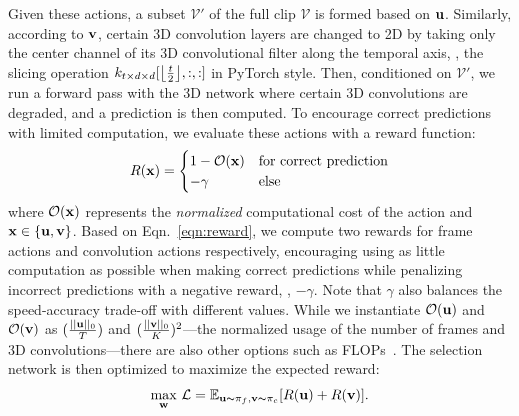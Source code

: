 \documentclass[final]{cvpr}
\DeclarePairedDelimiter\floor{\lfloor}{\rfloor}
\begin{document}
Given these actions, a subset $\mathcal{V}'$ of the full clip $\mathcal{V}$ is formed based on $\bf u$. Similarly, according to $\bf v$, certain 3D convolution layers are changed to 2D by taking only the center channel of its 3D convolutional filter along the temporal axis, \ie, the slicing operation $k_{t \times d \times d} [\floor*{\frac{t}{2}}, :, :]$ in PyTorch style. Then, conditioned on $\mathcal{V}'$, we run a forward pass with the 3D network where certain 3D convolutions are degraded, and a prediction is then computed. To encourage correct predictions with limited computation, we evaluate these actions with a reward function:
\begin{align}
R({\bf x}) = 
\begin{cases}
    1- \mathcal{O({\bf x})}   & \text{for correct prediction}\\
    -\gamma     & \text{else} \\
\end{cases}
\label{eqn:reward}
\end{align}
where $ \mathcal{O}({\bf x})$ represents the \emph{normalized} computational cost of the action and $\bf x \in \{\bf u, \bf v \}$. Based on Eqn.~\ref{eqn:reward}, we compute two rewards for frame actions and convolution actions respectively, encouraging using as little computation as possible when making correct predictions while penalizing incorrect predictions with a negative reward, \ie, $-\gamma$. Note that $\gamma$ also balances the speed-accuracy trade-off with different values. While we instantiate $\mathcal{O}({\bf u})$ and $\mathcal{O}({\bf v})$ as $(\frac{||{\bf u}||_0}{T})$ and $(\frac{||{\bf v}||_0}{K})^2$---the normalized usage of the number of frames and 3D convolutions---there are also other options such as FLOPs~\cite{arnet,amc}. The selection network is then optimized to maximize the expected reward:
\begin{align}
    \max_{\bf w}\,\mathcal{L} = \mathbb{E}_{{\bf u} \thicksim \pi_f, {\bf v} \thicksim \pi_c} [R({\bf u}) + R({\bf v})].
\end{align}
\end{document}
